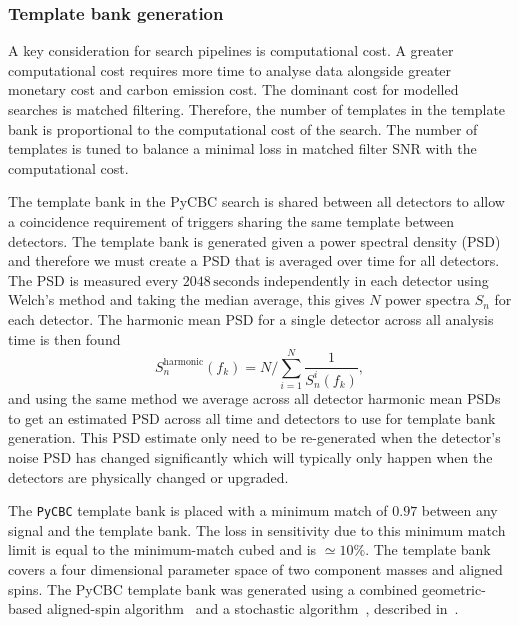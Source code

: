 \subsubsection{Template bank generation}

A key consideration for \gwadj search pipelines is computational cost. A greater computational cost requires more time to analyse \gwadj data alongside greater monetary cost and carbon emission cost. The dominant cost for modelled searches is matched filtering. Therefore, the number of templates in the template bank is proportional to the computational cost of the search. The number of templates is tuned to balance a minimal loss in matched filter SNR with the computational cost.

The template bank in the PyCBC search is shared between all detectors to allow a coincidence requirement of triggers sharing the same template between detectors. The template bank is generated given a power spectral density (PSD) and therefore we must create a PSD that is averaged over time for all detectors. The PSD is measured every $2048 \, \text{seconds}$ independently in each detector using Welch's method and taking the median average, this gives $N$ power spectra $S_{n}$ for each detector. The harmonic mean PSD for a single detector across all analysis time is then found
%
\begin{equation}
    S_{n}^{\text{harmonic}}(f_{k}) = N / \sum^{N}_{i = 1} \frac{1}{S^{i}_{n}(f_{k})},
\end{equation}
%
and using the same method we average across all detector harmonic mean PSDs to get an estimated PSD across all time and detectors to use for template bank generation. This PSD estimate only need to be re-generated when the detector's noise PSD has changed significantly which will typically only happen when the detectors are physically changed or upgraded.

The \texttt{PyCBC} template bank is placed with a minimum match of $0.97$ between any signal and the template bank. The loss in sensitivity due to this minimum match limit is equal to the minimum-match cubed and is ${\simeq}10\%$. The template bank covers a four dimensional parameter space of two component masses and aligned spins. The PyCBC template bank was generated using a combined geometric-based aligned-spin algorithm~\cite{Harry_Lundgren:2012, Harry_precession:2013} and a stochastic algorithm~\cite{Ajith:2012, Privitera:2013}, described in~\cite{pycbc_template_bank:2016}.

